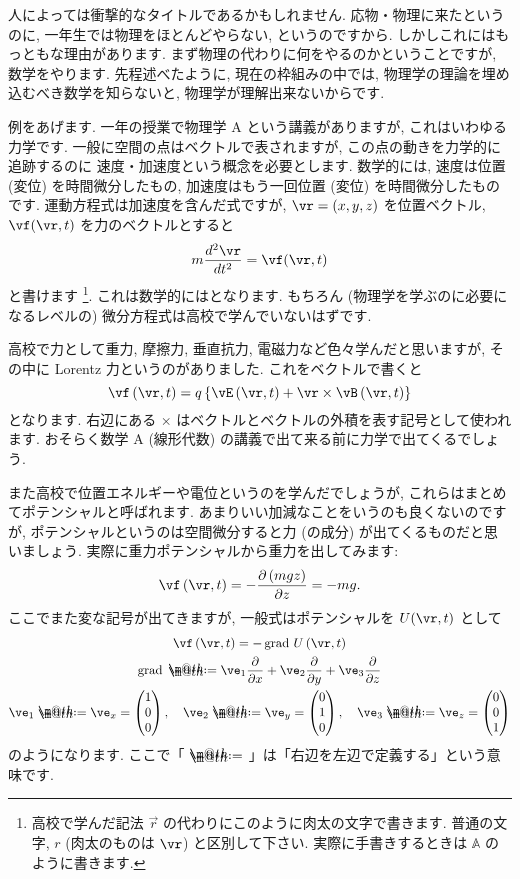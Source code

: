 \documentclass[openany, a4paper, oneside]{book}
\makeatletter
\newcommand*{\defeq}{\mathrel{\rlap{%
\raisebox{0.3ex}{$\m@th\cdot$}}%
\raisebox{-0.3ex}{$\m@th\cdot$}}%
=}
\DeclareMathOperator{\grad}{grad \,}
\theoremstyle{break}
\theoremstyle{breakdefn}
\newcommand{\rbk}[1]{\left (#1\right)}
\newcommand{\cbk}[1]{\left\{#1\right\}}
\newcommand{\bbA}{\mathbb{A}}
\newcommand{\vecc}[3]{\begin{pmatrix}#1\\#2\\#3\end{pmatrix}}
\newcommand{\pd}{\partial}
\makeatother
\begin{document}
人によっては衝撃的なタイトルであるかもしれません.
応物・物理に来たというのに, 一年生では物理をほとんどやらない, というのですから.
しかしこれにはもっともな理由があります.
まず物理の代わりに何をやるのかということですが, 数学をやります.
先程述べたように, 現在の枠組みの中では,
物理学の理論を埋め込むべき数学を知らないと, 物理学が理解出来ないからです.

例をあげます.
一年の授業で物理学 A という講義がありますが, これはいわゆる力学です.
一般に空間の点はベクトルで表されますが, この点の動きを力学的に追跡するのに
速度・加速度という概念を必要とします.
数学的には, 速度は位置 (変位) を時間微分したもの,
加速度はもう一回位置 (変位) を時間微分したものです.
運動方程式は加速度を含んだ式ですが,
$\vr = (x, y, z)$ を位置ベクトル,
$\vf (\vr, t)$ を力のベクトルとすると
\begin{equation}
 m\frac{d^{2}\vr}{dt^{2}}=\vf (\vr, t)
\end{equation}
と書けます \footnote{高校で学んだ記法 $\vec{r}$ の代わりにこのように肉太の文字で書きます.
普通の文字, $r$ (肉太のものは $\vr$) と区別して下さい.
実際に手書きするときは $\bbA$ のように書きます.
 }.
これは数学的にはとなります.
もちろん (物理学を学ぶのに必要になるレベルの) 微分方程式は高校で学んでいないはずです.

高校で力として重力, 摩擦力, 垂直抗力, 電磁力など色々学んだと思いますが,
その中に Lorentz 力というのがありました.
これをベクトルで書くと
\begin{equation}
 \vf \rbk{\vr,t } = q \cbk{ \vE  \rbk{ \vr ,t } + \vr \times \vB \rbk{\vr,t } }
\end{equation}
となります.
右辺にある $\times$ はベクトルとベクトルの外積を表す記号として使われます.
おそらく数学 A (線形代数) の講義で出て来る前に力学で出てくるでしょう.

また高校で位置エネルギーや電位というのを学んだでしょうが,
これらはまとめてポテンシャルと呼ばれます.
あまりいい加減なことをいうのも良くないのですが,
ポテンシャルというのは空間微分すると力 (の成分) が出てくるものだと思いましょう.
実際に重力ポテンシャルから重力を出してみます:
\begin{equation}
 \vf \rbk{ \vr,t } = - \frac{ \pd \rbk{ mgz }}{ \pd z} = -mg.
\end{equation}
ここでまた変な記号が出てきますが, 一般式はポテンシャルを $U ( \vr,t)$ として
\begin{gather}
 \vf \rbk{ \vr,t }
 =
 -\grad U \rbk{ \vr,t } \\
 \grad
 \defeq
 \ve_{1} \frac{ \pd }{\pd x} + \ve_{2} \frac{ \pd }{\pd y}
        +\ve_{3} \frac{ \pd }{\pd z} \\
 \ve_{1}
 \defeq
 \ve_{x}
 =
 \vecc{1}{0}{0}
 , \quad
 \ve_{2}
 \defeq
 \ve_{y}
 =
 \vecc{0}{1}{0}, \quad \ve_3
 \defeq
 \ve_{z}
 =
 \vecc{0}{0}{1}
\end{gather}
のようになります.
ここで「 $\defeq$ 」は「右辺を左辺で定義する」という意味です.
\end{document}

